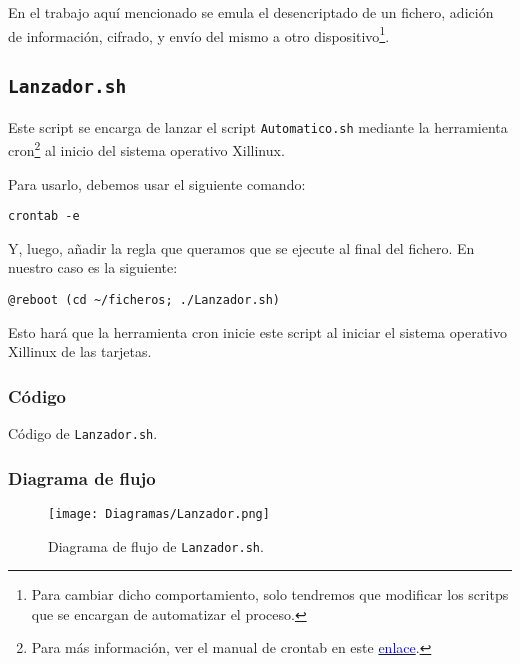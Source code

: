 \documentclass[12pt,letterpaper]{article}
\begin{document}
En el trabajo aquí mencionado se emula el desencriptado de un fichero, adición de información, cifrado, y envío del mismo a otro dispositivo\footnote{Para cambiar dicho comportamiento, solo tendremos que modificar los scritps que se encargan de automatizar el proceso.}.


\subsection{\texttt{Lanzador.sh}}
Este script se encarga de lanzar el script \texttt{Automatico.sh} mediante la herramienta cron\footnote{Para más información, ver el manual de crontab en este \href{https://linux.die.net/man/5/crontab}{\textcolor{blue}{enlace}}.} al inicio del sistema operativo Xillinux.

Para usarlo, debemos usar el siguiente comando:
\begin{center}
	\texttt{crontab -e}
\end{center}

Y, luego, añadir la regla que queramos que se ejecute al final del fichero. En nuestro caso es la siguiente:
\begin{center}
	\texttt{@reboot (cd \textasciitilde/ficheros; ./Lanzador.sh)}
\end{center}

Esto hará que la herramienta cron inicie este script al iniciar el sistema operativo Xillinux de las tarjetas.
\subsubsection{Código}

\begin{center}
	Código de \texttt{Lanzador.sh}.
\end{center}

\newpage
\subsubsection{Diagrama de flujo}
\begin{figure}[h]
	\centering
	\texttt{[image: Diagramas/Lanzador.png]}
	\caption{Diagrama de flujo de \texttt{Lanzador.sh}.}
	\label{Diagrama de flujo de Lanzador.sh}
\end{figure}
\end{document}
